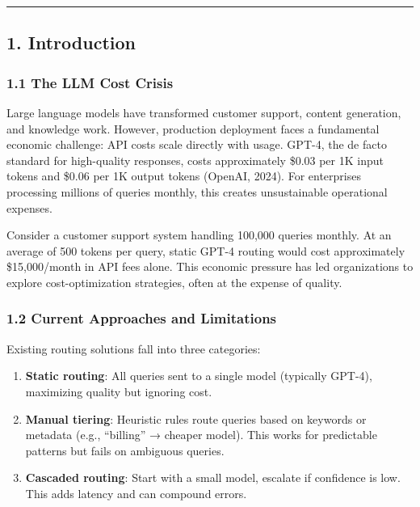 \documentclass[
]{article}
\providecommand{\tightlist}{%
  \setlength{\itemsep}{0pt}\setlength{\parskip}{0pt}}
\begin{document}
\begin{center}\rule{0.5\linewidth}{0.5pt}\end{center}

\hypertarget{introduction}{%
\subsection{1. Introduction}\label{introduction}}

\hypertarget{the-llm-cost-crisis}{%
\subsubsection{1.1 The LLM Cost Crisis}\label{the-llm-cost-crisis}}

Large language models have transformed customer support, content
generation, and knowledge work. However, production deployment faces a
fundamental economic challenge: API costs scale directly with usage.
GPT-4, the de facto standard for high-quality responses, costs
approximately \$0.03 per 1K input tokens and \$0.06 per 1K output tokens
(OpenAI, 2024). For enterprises processing millions of queries monthly,
this creates unsustainable operational expenses.

Consider a customer support system handling 100,000 queries monthly. At
an average of 500 tokens per query, static GPT-4 routing would cost
approximately \$15,000/month in API fees alone. This economic pressure
has led organizations to explore cost-optimization strategies, often at
the expense of quality.

\hypertarget{current-approaches-and-limitations}{%
\subsubsection{1.2 Current Approaches and
Limitations}\label{current-approaches-and-limitations}}

Existing routing solutions fall into three categories:

\begin{enumerate}
\def\labelenumi{\arabic{enumi}.}
\tightlist
\item
  \textbf{Static routing}: All queries sent to a single model (typically
  GPT-4), maximizing quality but ignoring cost.
\item
  \textbf{Manual tiering}: Heuristic rules route queries based on
  keywords or metadata (e.g., ``billing'' → cheaper model). This works
  for predictable patterns but fails on ambiguous queries.
\item
  \textbf{Cascaded routing}: Start with a small model, escalate if
  confidence is low. This adds latency and can compound errors.
\end{enumerate}
\end{document}
